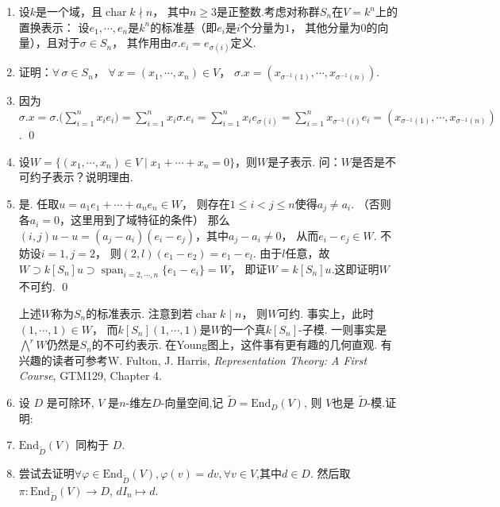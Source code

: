 \begin{enumerate}
\item[9.9] 设$k$是一个域，且$\operatorname{char} k \nmid n$，
    其中$n\ge3$是正整数.考虑对称群$S_{n}$在$V=k^{n}$上的置换表示：
    设$e_{1},\cdots,e_{n}$是$k^{n}$的标准基（即$e_{i}$是$i$个分量为$1$，
    其他分量为$0$的向量），且对于$\sigma \in S_{n}$，
    其作用由$\sigma.e_{i}=e_{\sigma(i)}$定义.
    \item[(a)] 证明：$\forall \, \sigma \in S_{n}$，
        $\forall \, x = (x_{1},\cdots,x_{n}) \in V$，
        $\sigma.x=(x_{\sigma^{-1}(1)},\cdots,x_{\sigma^{-1}(n)})$.
        \item[\textbf{证明:}]
        因为$\sigma.x = \sigma.\big(\sum_{i=1}^{n}x_{i}e_{i}\big) 
        = \sum_{i=1}^{n}x_{i} \sigma.e_{i} = \sum_{i=1}^{n}x_{i} e_{\sigma(i)}
        = \sum_{i=1}^{n}x_{\sigma^{-1}(i)}e_{i} 
        = (x_{\sigma^{-1}(1)},\cdots,x_{\sigma^{-1}(n)})$. \qed
    \item[(b)] 设$W = \{(x_{1},\cdots,x_{n}) \in V \mid
        x_{1} + \cdots + x_{n}=0\}$，则$W$是子表示. 
        问：$W$是否是不可约子表示？说明理由.
    \item[\textbf{解:}]
        是. 任取$u = a_{1}e_{1} + \cdots + a_{n}e_{n} \in W$，
        则存在$1 \leq i < j \leq n$使得$a_{j} \neq a_{i}$. 
        （否则各$a_i=0$，这里用到了域特征的条件）
        那么$(i,j)u -u = (a_j-a_i)(e_{i}-e_{j})$，其中$a_j-a_i\ne0$，
        从而$e_{i} - e_{j} \in W$. 不妨设$i=1,j=2$，
        则$(2,l)(e_{1}-e_{2})=e_{1}-e_{l}$.
        由于$l$任意，故$W \supset k[S_{n}]u \supset 
        \operatorname{span}_{i=2,\cdots,n}\{e_{1}-e_{i}\} = W$，
        即证$W = k[S_{n}]u$.这即证明$W$不可约. \qed

\begin{remark}
    上述$W$称为$S_{n}$的标准表示. 注意到若$\operatorname{char} k \mid n$，
    则$W$可约. 事实上，此时$(1,\cdots,1) \in W$，
    而$k[S_{n}](1,\cdots,1)$是$W$的一个真$k[S_{n}]$-子模. 
    一则事实是$\bigwedge^{r}W$仍然是$S_{n}$的不可约表示.
    在Young图上，这件事有更有趣的几何直观. 
    有兴趣的读者可参考W. Fulton, J. Harris, 
    \textit{Representation Theory: A First Course}, GTM129, Chapter 4.
\end{remark}
\item[10.0] 设 $D$ 是可除环, $V$ 是$n$-维左$D$-向量空间,记 $\tilde{D} = \mathrm{End}_D(V)$, 则 $V$也是 $\tilde{D}$-模.证
明:
\item[(i)] $\mathrm{End}_{\tilde{D}}(V)$ 同构于 $D$. 
\item[\textbf{证明:}]
尝试去证明$\forall \varphi \in \mathrm{End}_{\tilde{D}}(V), \varphi(v) = dv, \forall v \in V$,其中$d \in D$.
然后取$\pi : \mathrm{End}_{\tilde{D}}(V) \to D$, $d I_n \mapsto d$.


\end{enumerate}
